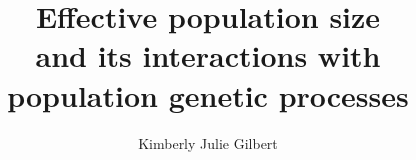 \documentclass[
12pt         %
,twoside     %
,openright   %
]{mythesis}
\title{Effective population size \\%
  and its interactions with \\ population genetic processes}
\author{Kimberly Julie Gilbert}
\begin{document}
\maketitle




\allcontents


\cleardoublepage
\mainbody






\formatbibliography



\formatappendices

\end{document}
